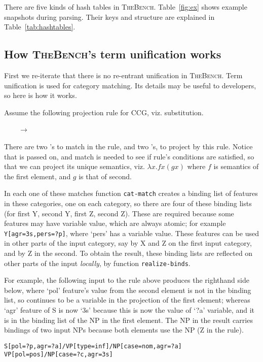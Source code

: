 \documentclass[11pt]{article}
\newcommand{\tool}{\textsc{TheBench}}
\begin{document}
{{There are five kinds of hash tables in \tool. Table~\ref{fig:ex} shows example snapshots during parsing.
Their keys and structure are explained in Table~\ref{tab:hashtables}.





\subsection{How \tool's term unification works}
{First we re-iterate that there is no re-entrant unification in \tool. Term unification is used for category matching. Its details may be useful to developers, so here is how it works.}

Assume the following projection rule for CCG, viz. substitution. 

{~~~~$\rightarrow$ }

\noindent There are two 's to match in the rule, and two 's, to project by this rule.
Notice that  is passed on, and  match is needed to see if rule's conditions are satisfied, so that
we can project its unique semantics, viz. $\lambda x.fx(gx)$ where $f$ is semantics of the first element, and $g$ is that of second.


{In each one of these matches function} \verb|cat-match| {creates a binding list of features in these categories, one on each category, so there are
four of these binding lists (for first Y, second Y, first Z, second Z). These are required because some features may have variable value, which are always atomic; for example
} \verb|Y[agr=3s,pers=?p]|, {where `pers' has a variable value. These features can be used in other parts of the input category, say by X and Z on the first input category, and by Z
in the second. To obtain the result, these binding lists are reflected on other parts of the input \emph{locally}, by function} \verb|realize-binds|.

{For example, the following input to the rule above produces the righthand side below, where `pol' feature's value from the second element
 is not in the binding list, so continues to be a variable in the projection of the first element; whereas `agr' feature of S is now `3s' because this is now the value of `?a'
 variable, and it is in the binding list of the NP in the first element. The NP in the result carries bindings of two input NPs because both elements use the NP (Z in the rule).}
 
\noindent\verb|S[pol=?p,agr=?a]/VP[type=inf]/NP[case=nom,agr=?a]   VP[pol=pos]/NP[case=?c,agr=3s]|
 
}}
\end{document}
